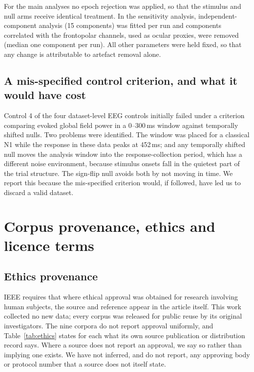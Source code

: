 For the main analyses no epoch rejection was applied, so that the stimulus and
null arms receive identical treatment. In the sensitivity analysis,
independent-component analysis (15 components) was fitted per run and
components correlated with the frontopolar channels, used as ocular proxies,
were removed (median one component per run). All other parameters were held
fixed, so that any change is attributable to artefact removal alone.

\subsection{A mis-specified control criterion, and what it would have cost}

Control 4 of the four dataset-level EEG controls initially failed under a
criterion comparing evoked global field power in a 0--300\,ms window against
temporally shifted nulls. Two problems were identified. The window was placed
for a classical N1 while the response in these data peaks at 452\,ms; and any
temporally shifted null moves the analysis window into the response-collection
period, which has a different noise environment, because stimulus onsets fall
in the quietest part of the trial structure. The sign-flip null avoids both by
not moving in time. We report this because the mis-specified criterion would,
if followed, have led us to discard a valid dataset.

\clearpage
\section{Corpus provenance, ethics and licence terms}

\subsection{Ethics provenance}

IEEE requires that where ethical approval was obtained for research involving
human subjects, the source and reference appear in the article itself. This
work collected no new data; every corpus was released for public reuse by its
original investigators. The nine corpora do not report approval uniformly, and
Table~\ref{tab:ethics} states for each what its own source publication or
distribution record says. Where a source does not report an approval, we say
so rather than implying one exists. We have not inferred, and do not report,
any approving body or protocol number that a source does not itself state.

